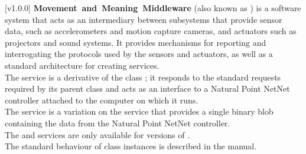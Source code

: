 [v1.0.0]
\textbf{Movement~and~Meaning~Middleware} (also known as \mplusm) is a software system
that acts as an intermediary between subsystems that provide sensor data, such as
accelerometers and motion capture cameras, and actuators such as projectors and sound
systems.
It provides mechanisms for reporting and interrogating the protocols used by the sensors
and actuators, as well as a standard architecture for creating services.\\

The \NNI{} service is a derivative of the \mplusm{} class ;
it responds to the standard requests required by its parent class and acts as an interface
to a Natural Point NetNet controller attached to the computer on which it runs.\\

The \NNBI{} service is a variation on the \NNI{} service that provides a single binary
blob containing the data from the Natural Point NetNet controller.\\

The \NNI{} and \NNBI{} services are only available for \win{} versions of \mplusm.\\

The standard behaviour of  class instances is described in
the \emph{\MMM} manual.
\primaryEnd{}
